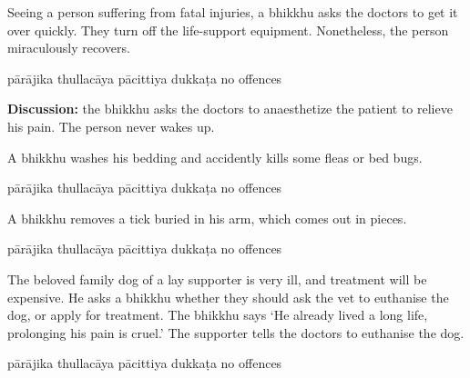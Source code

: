 \begin{exam}{\autoExamName}
\begin{problem*}
\begin{parts}
  \item Seeing a person suffering from fatal injuries, a bhikkhu asks the doctors to
  get it over quickly. They turn off the life-support equipment. Nonetheless, the person
  miraculously recovers.

  \bigskip

  \begin{answers}{5}
    \bChoices
     pārājika\eAns
     thullacāya\eAns
     pācittiya\eAns
     dukkaṭa\eAns
     no offences\eAns
    \eChoices
  \end{answers}

  \bigskip

  \textbf{Discussion:} the bhikkhu asks the doctors to anaesthetize the patient to relieve his pain. The person never wakes up.

  \bigskip

  \item A bhikkhu washes his bedding and accidently kills some fleas or bed bugs.

  \bigskip

  \begin{answers}{5}
    \bChoices
     pārājika\eAns
     thullacāya\eAns
     pācittiya\eAns
     dukkaṭa\eAns
     no offences\eAns
    \eChoices
  \end{answers}

  \bigskip

  \item A bhikkhu removes a tick buried in his arm, which comes out in pieces.

  \bigskip

  \begin{answers}{5}
    \bChoices
     pārājika\eAns
     thullacāya\eAns
     pācittiya\eAns
     dukkaṭa\eAns
     no offences\eAns
    \eChoices
  \end{answers}

  \bigskip

  \item The beloved family dog of a lay supporter is very ill, and treatment will
    be expensive. He asks a bhikkhu whether they should ask the vet to euthanise
    the dog, or apply for treatment. The bhikkhu says `He already lived a long
    life, prolonging his pain is cruel.' The supporter tells the doctors to
    euthanise the dog.

  \bigskip

  \begin{answers}{5}
    \bChoices
     pārājika\eAns
     thullacāya\eAns
     pācittiya\eAns
     dukkaṭa\eAns
     no offences\eAns
    \eChoices
  \end{answers}


\end{parts}
\end{problem*}
\end{exam}
